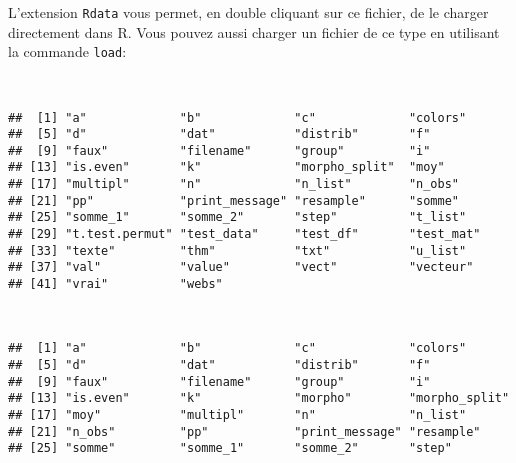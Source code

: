 \noindent L'extension \texttt{Rdata} vous permet, en double cliquant sur ce fichier, de le charger directement dans R.
Vous pouvez aussi charger un fichier de ce type en utilisant la commande \texttt{load}:

\begin{knitrout}
\color{fgcolor}\begin{kframe}
\begin{flushleft}
\ttfamily\noindent
{}\hlkeyword{(}\hlkeyword{)}\hspace*{\fill}\\
\hlstd{}\hlkeyword{(}\hlkeyword{)}\mbox{}
\normalfont
\end{flushleft}
\begin{verbatim}
##  [1] "a"             "b"             "c"             "colors"       
##  [5] "d"             "dat"           "distrib"       "f"            
##  [9] "faux"          "filename"      "group"         "i"            
## [13] "is.even"       "k"             "morpho_split"  "moy"          
## [17] "multipl"       "n"             "n_list"        "n_obs"        
## [21] "pp"            "print_message" "resample"      "somme"        
## [25] "somme_1"       "somme_2"       "step"          "t_list"       
## [29] "t.test.permut" "test_data"     "test_df"       "test_mat"     
## [33] "texte"         "thm"           "txt"           "u_list"       
## [37] "val"           "value"         "vect"          "vecteur"      
## [41] "vrai"          "webs"         
\end{verbatim}
\begin{flushleft}
\ttfamily\noindent
{}\hlkeyword{(}\hlkeyword{)}\hspace*{\fill}\\
\hlstd{}\hlkeyword{(}\hlkeyword{)}\mbox{}
\normalfont
\end{flushleft}
\begin{verbatim}
##  [1] "a"             "b"             "c"             "colors"       
##  [5] "d"             "dat"           "distrib"       "f"            
##  [9] "faux"          "filename"      "group"         "i"            
## [13] "is.even"       "k"             "morpho"        "morpho_split" 
## [17] "moy"           "multipl"       "n"             "n_list"       
## [21] "n_obs"         "pp"            "print_message" "resample"     
## [25] "somme"         "somme_1"       "somme_2"       "step"         

\end{verbatim}
\end{kframe}
\end{knitrout}
